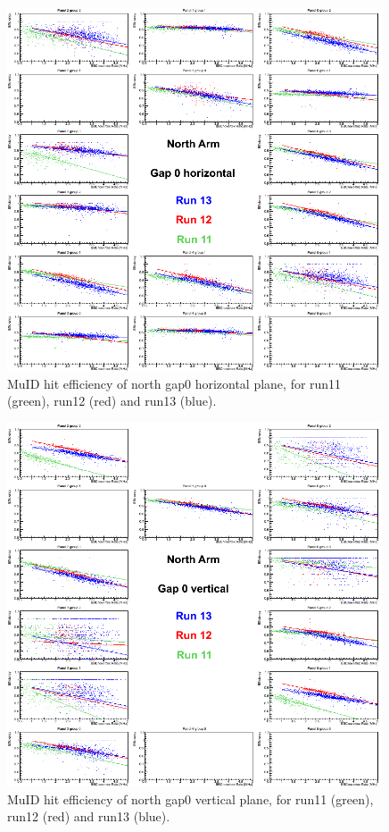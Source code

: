 \begin{figure}[h!]

  \centering
  \includegraphics[width=0.99\textwidth]{./figures/efficomp_North_gap0_horizontal.png}
  \caption{\label{Fig:efficiency:MuIdEff:a1g0p0}MuID hit efficiency of north gap0 horizontal plane, for run11 (green), run12 (red) and run13 (blue).}
\end{figure}
\clearpage


\begin{figure}[h!]

  \centering
  \includegraphics[width=0.99\textwidth]{./figures/efficomp_North_gap0_vertical.png}
  \caption{\label{Fig:efficiency:MuIdEff:a1g0p1}MuID hit efficiency of north gap0 vertical plane, for run11 (green), run12 (red) and run13 (blue).}
\end{figure}
\clearpage


